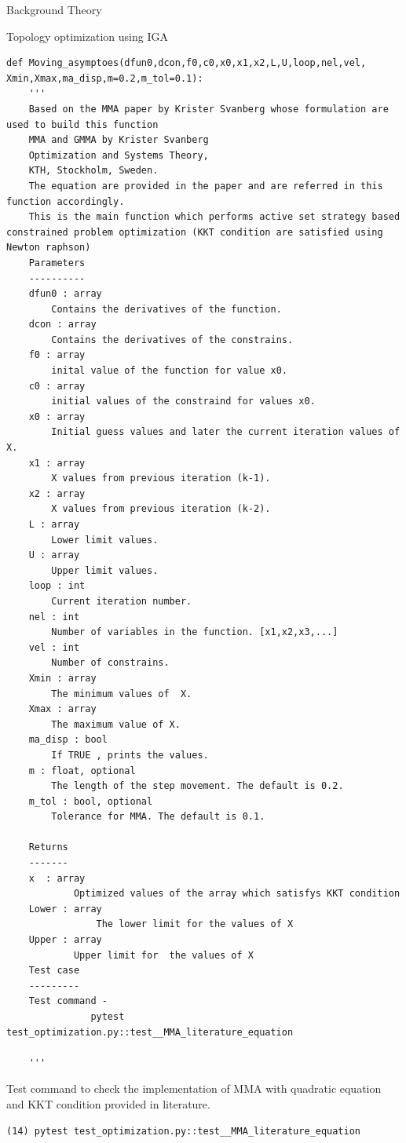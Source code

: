 \documentclass[a4paper,12pt,times]{article}
\begin{document}
\begin{section}{Background Theory}
\begin{subsection}{Topology optimization using IGA}
\begin{lstlisting}
def Moving_asymptoes(dfun0,dcon,f0,c0,x0,x1,x2,L,U,loop,nel,vel,
Xmin,Xmax,ma_disp,m=0.2,m_tol=0.1):
    '''
    Based on the MMA paper by Krister Svanberg whose formulation are used to build this function
    MMA and GMMA by Krister Svanberg
    Optimization and Systems Theory,
    KTH, Stockholm, Sweden.
    The equation are provided in the paper and are referred in this function accordingly.
    This is the main function which performs active set strategy based constrained problem optimization (KKT condition are satisfied using Newton raphson)
    Parameters
    ----------
    dfun0 : array
        Contains the derivatives of the function.
    dcon : array
        Contains the derivatives of the constrains.
    f0 : array
        inital value of the function for value x0.
    c0 : array
        initial values of the constraind for values x0.
    x0 : array
        Initial guess values and later the current iteration values of X.
    x1 : array
        X values from previous iteration (k-1).
    x2 : array
        X values from previous iteration (k-2).
    L : array
        Lower limit values.
    U : array
        Upper limit values.
    loop : int
        Current iteration number.
    nel : int 
        Number of variables in the function. [x1,x2,x3,...]
    vel : int
        Number of constrains.
    Xmin : array
        The minimum values of  X.
    Xmax : array
        The maximum value of X.
    ma_disp : bool
        If TRUE , prints the values.
    m : float, optional
        The length of the step movement. The default is 0.2.
    m_tol : bool, optional
        Tolerance for MMA. The default is 0.1.

    Returns
    -------
    x  : array
            Optimized values of the array which satisfys KKT condition
    Lower : array
                The lower limit for the values of X
    Upper : array
            Upper limit for  the values of X
    Test case
    ---------
    Test command -
               pytest test_optimization.py::test__MMA_literature_equation

    '''
\end{lstlisting}
Test command to check the implementation of MMA with quadratic equation and KKT condition provided in literature.\cite{https://doi.org/10.1002/nme.1620240207}
\begin{lstlisting}
(14) pytest test_optimization.py::test__MMA_literature_equation
\end{lstlisting}
\end{subsection}
\end{section}
\end{document}
